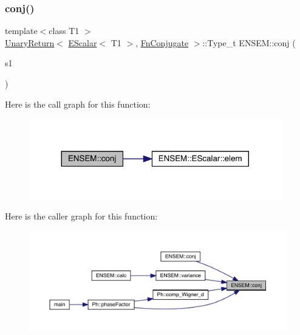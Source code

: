 \subsubsection{\texorpdfstring{conj()}{conj()}}
{\footnotesize\ttfamily template$<$class T1 $>$ \\
\mbox{\hyperlink{structENSEM_1_1UnaryReturn}{Unary\+Return}}$<$ \mbox{\hyperlink{classENSEM_1_1EScalar}{E\+Scalar}}$<$ T1 $>$, \mbox{\hyperlink{structENSEM_1_1FnConjugate}{Fn\+Conjugate}} $>$\+::Type\+\_\+t E\+N\+S\+E\+M\+::conj (\begin{DoxyParamCaption}\item[{const \mbox{\hyperlink{classENSEM_1_1EScalar}{E\+Scalar}}$<$ T1 $>$ \&}]{s1 }\end{DoxyParamCaption})\hspace{0.3cm}{\ttfamily [inline]}}

Here is the call graph for this function\+:
\nopagebreak
\begin{figure}[H]
\begin{center}
\leavevmode
\includegraphics[width=311pt]{d4/dca/group__escalar_ga291c7e9b7f872b3e6db0d75ff3421b6a_cgraph}
\end{center}
\end{figure}
Here is the caller graph for this function\+:
\nopagebreak
\begin{figure}[H]
\begin{center}
\leavevmode
\includegraphics[width=350pt]{d4/dca/group__escalar_ga291c7e9b7f872b3e6db0d75ff3421b6a_icgraph}
\end{center}
\end{figure}
\mbox{\label{group__escalar_ga6c04652cc005e69e9785effa182a8436}} 
